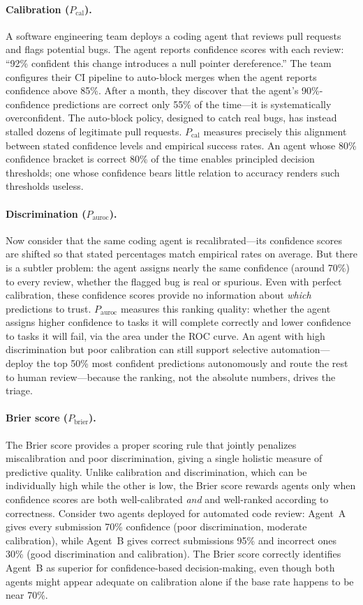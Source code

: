 \documentclass[11pt]{article}
\begin{document}
\paragraph{Calibration ($P_{\text{cal}}$).}
A software engineering team deploys a coding agent that reviews pull requests and flags potential bugs.
The agent reports confidence scores with each review: ``92\% confident this change introduces a null pointer dereference.''
The team configures their CI pipeline to auto-block merges when the agent reports confidence above 85\%.
After a month, they discover that the agent's 90\%-confidence predictions are correct only 55\% of the time---it is systematically overconfident.
The auto-block policy, designed to catch real bugs, has instead stalled dozens of legitimate pull requests.
$P_{\text{cal}}$ measures precisely this alignment between stated confidence levels and empirical success rates.
An agent whose 80\% confidence bracket is correct 80\% of the time enables principled decision thresholds; one whose confidence bears little relation to accuracy renders such thresholds useless.

\paragraph{Discrimination ($P_{\text{auroc}}$).}
Now consider that the same coding agent is recalibrated---its confidence scores are shifted so that stated percentages match empirical rates on average.
But there is a subtler problem: the agent assigns nearly the same confidence (around 70\%) to every review, whether the flagged bug is real or spurious.
Even with perfect calibration, these confidence scores provide no information about \emph{which} predictions to trust.
$P_{\text{auroc}}$ measures this ranking quality: whether the agent assigns higher confidence to tasks it will complete correctly and lower confidence to tasks it will fail, via the area under the ROC curve.
An agent with high discrimination but poor calibration can still support selective automation---deploy the top 50\% most confident predictions autonomously and route the rest to human review---because the ranking, not the absolute numbers, drives the triage.

\paragraph{Brier score ($P_{\text{brier}}$).}
The Brier score provides a proper scoring rule that jointly penalizes miscalibration and poor discrimination, giving a single holistic measure of predictive quality.
Unlike calibration and discrimination, which can be individually high while the other is low, the Brier score rewards agents only when confidence scores are both well-calibrated \emph{and} and well-ranked according to correctness.
Consider two agents deployed for automated code review: Agent~A gives every submission 70\% confidence (poor discrimination, moderate calibration), while Agent~B gives correct submissions 95\% and incorrect ones 30\% (good discrimination and calibration).
The Brier score correctly identifies Agent~B as superior for confidence-based decision-making, even though both agents might appear adequate on calibration alone if the base rate happens to be near 70\%.
\end{document}
